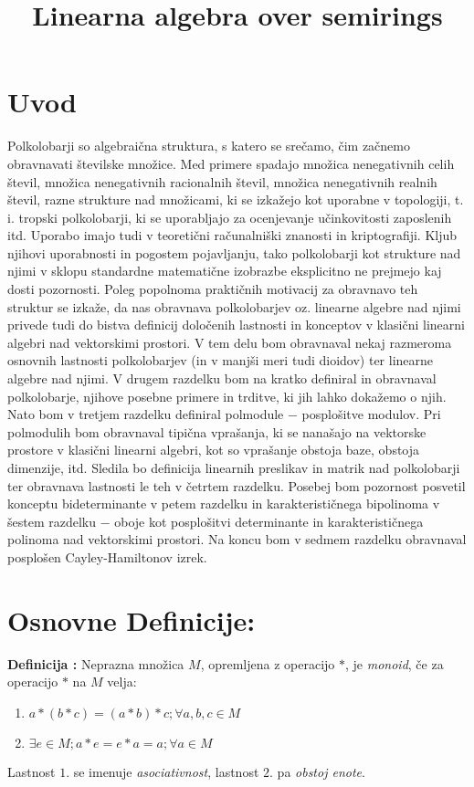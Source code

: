 \documentclass[mat1]{fmfdelo}
\title{Linearna algebra over semirings}
\newcommand{\pojem}[1]{\emph{#1}}
\newcounter{defcount}
\newenvironment{definicija}{\begin{flushleft}\stepcounter{defcount}\textbf{Definicija \arabic{defcount}:}}{\hfill\end{flushleft}}
\begin{document}
\maketitle
\newpage
\tableofcontents
\newpage
\section{Uvod}

Polkolobarji so algebraična struktura, s katero se srečamo, čim začnemo obravnavati številske množice. Med primere spadajo množica nenegativnih celih števil, množica nenegativnih racionalnih števil, množica nenegativnih realnih števil, razne strukture nad množicami, ki se izkažejo kot uporabne v topologiji, t. i. tropski polkolobarji, ki se uporabljajo za ocenjevanje učinkovitosti zaposlenih itd. Uporabo imajo tudi v teoretični računalniški znanosti in kriptografiji. Kljub njihovi uporabnosti in pogostem pojavljanju, tako polkolobarji kot strukture nad njimi v sklopu standardne matematične izobrazbe eksplicitno ne prejmejo kaj dosti pozornosti. Poleg popolnoma praktičnih motivacij za obravnavo teh struktur se izkaže, da nas obravnava polkolobarjev oz. linearne algebre nad njimi privede tudi do bistva definicij določenih lastnosti in konceptov v klasični linearni algebri nad vektorskimi prostori. V tem delu bom obravnaval nekaj razmeroma osnovnih lastnosti polkolobarjev (in v manjši meri tudi dioidov) ter linearne algebre nad njimi. V drugem razdelku bom na kratko definiral in obravnaval polkolobarje, njihove posebne primere in trditve, ki jih lahko dokažemo o njih. Nato bom v tretjem razdelku definiral polmodule $-$ posplošitve modulov. Pri polmodulih bom obravnaval tipična vprašanja, ki se nanašajo na vektorske prostore v klasični linearni algebri, kot so vprašanje obstoja baze, obstoja dimenzije, itd. Sledila bo definicija linearnih preslikav in matrik nad polkolobarji ter obravnava lastnosti le teh v četrtem razdelku. Posebej bom pozornost posvetil konceptu bideterminante v petem razdelku in karakterističnega bipolinoma v šestem razdelku $-$ oboje kot posplošitvi determinante in karakterističnega polinoma nad vektorskimi prostori. Na koncu bom v sedmem razdelku obravnaval posplošen Cayley-Hamiltonov izrek.

\section{Osnovne Definicije:}

\begin{definicija}
	Neprazna množica $M$, opremljena z operacijo $\ast$, je \pojem{monoid}, če za operacijo $\ast$ na $M$ velja:
	\begin{enumerate}
		\item $a \ast (b \ast c) = (a\ast b) \ast c;\forall a, b, c \in M$
		\item $\exists e\in M; a \ast e = e\ast a = a;\forall a\in M$
	\end{enumerate}
	Lastnost $1.$ se imenuje \pojem{asociativnost}, lastnost $2.$ pa \pojem{obstoj enote}. 
\end{definicija}
\end{document}

